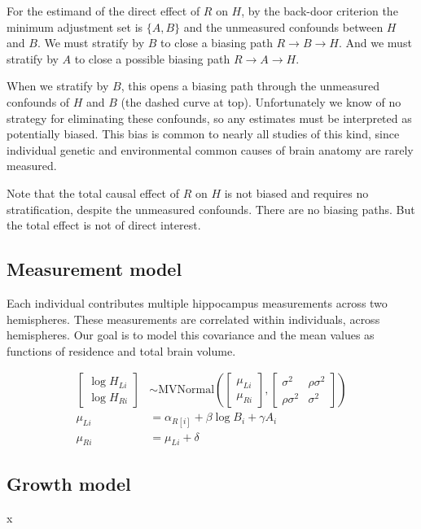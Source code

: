 \documentclass[reqno ,11pt]{amsart}
\begin{document}
For the estimand of the direct effect of $R$ on $H$, by the back-door criterion \citep{Pearl1993} the minimum adjustment set is $\{A,B\}$ and the unmeasured confounds between $H$ and $B$. We must stratify by $B$ to close a biasing path $R \rightarrow B \rightarrow H$. And we must stratify by $A$ to close a possible biasing path $R \rightarrow A \rightarrow H$.

When we stratify by $B$, this opens a biasing path through the unmeasured confounds of $H$ and $B$ (the dashed curve at top). Unfortunately we know of no strategy for eliminating these confounds, so any estimates must be interpreted as potentially biased. This bias is common to nearly all studies of this kind, since individual genetic and environmental common causes of brain anatomy are rarely measured.

Note that the total causal effect of $R$ on $H$ is not biased and requires no stratification, despite the unmeasured confounds. There are no biasing paths. But the total effect is not of direct interest.

\subsection{Measurement model}

Each individual contributes multiple hippocampus measurements across two hemispheres. These measurements are correlated within individuals, across hemispheres. Our goal is to model this covariance and the mean values as functions of residence and total brain volume. 

\begin{align*}
\begin{bmatrix} \log H_{Li} \\ \log H_{Ri} \end{bmatrix}
&\sim \text{MVNormal} \left( 
\begin{bmatrix} \mu_{Li} \\ \mu_{Ri} \end{bmatrix} , 
\begin{bmatrix}
\sigma^2 & \rho \sigma^2 \\
\rho \sigma^2 & \sigma^2 
\end{bmatrix}
\right) \\
\mu_{Li} &= \alpha_{R[i]} + \beta \log B_i + \gamma A_i \\
\mu_{Ri} &= \mu_{Li} + \delta
\end{align*}


\subsection{Growth model}
x
\end{document}
